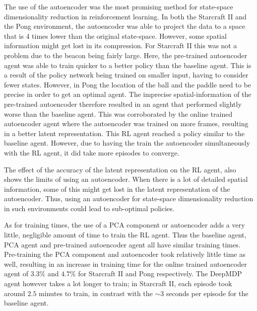The use of the autoencoder was the most promising method for state-space dimensionality reduction in reinforcement learning. In both the Starcraft II and the Pong environment, the autoencoder was able to project the data to a space that is 4 times lower than the original state-space. However, some spatial information might get lost in its compression. For Starcraft II this was not a problem due to the beacon being fairly large. Here, the pre-trained autoencoder agent was able to train quicker to a better policy than the baseline agent. This is a result of the policy network being trained on smaller input, having to consider fewer states. However, in Pong the location of the ball and the paddle need to be precise in order to get an optimal agent. The imprecise spatial-information of the pre-trained autoencoder therefore resulted in an agent that performed slightly worse than the baseline agent. This was corroborated  by the online trained autoencoder agent where the autoencoder was trained on more frames, resulting in a better latent representation. This RL agent reached a policy similar to the baseline agent. However, due to having the train the autoencoder simultaneously with the RL agent, it did take more episodes to converge. 

The effect of the accuracy of the latent representation on the RL agent, also shows the limits of using an autoencoder. When there is a lot of detailed spatial information, some of this might get lost in the latent representation of the autoencoder. Thus, using an autoencoder for state-space dimensionality reduction in such environments could lead to sub-optimal policies.

As for training times, the use of a PCA component or autoencoder adds a very little, negligible amount of time to train the RL agent. Thus the baseline agent, PCA agent and pre-trained autoencoder agent all have similar training times. Pre-training the PCA component and autoencoder took relatively little time as well, resulting in an increase in training time for the online trained autoencoder agent of $3.3\%$ and $4.7\%$ for Starcraft II and Pong respectively. The DeepMDP agent however takes a lot longer to train; in Starcraft II, each episode took around $2.5$ minutes to train, in contrast with the $\sim3$ seconds per episode for the baseline agent.